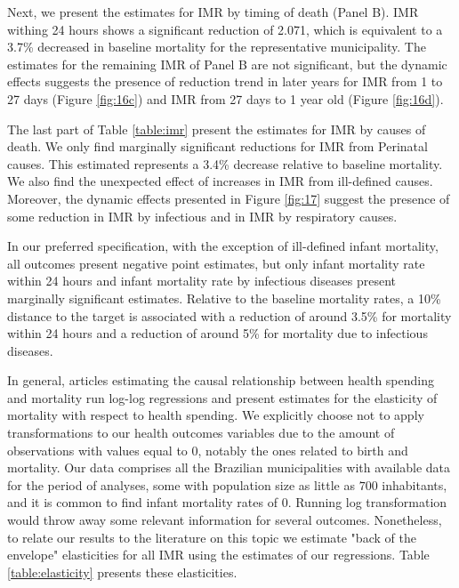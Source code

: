 

Next, we present the estimates for IMR by timing of death (Panel B). IMR withing 24 hours shows a significant reduction of 2.071, which is equivalent to a 3.7\% decreased in baseline mortality for the representative municipality. The estimates for the remaining IMR of Panel B are not significant, but the dynamic effects suggests the presence of reduction trend in later years for IMR from 1 to 27 days (Figure \ref{fig:16c}) and IMR from 27 days to 1 year old (Figure \ref{fig:16d}).



The last part of Table \ref{table:imr} present the estimates for IMR by causes of death. We only find marginally significant reductions for IMR from Perinatal causes. This estimated represents a 3.4\% decrease relative to baseline mortality. We also find the unexpected effect of increases in IMR from ill-defined causes. Moreover, the dynamic effects presented in Figure \ref{fig:17} suggest the presence of some reduction in IMR by infectious and in IMR by respiratory causes.

In our preferred specification, with the exception of ill-defined infant mortality, all outcomes present negative point estimates, but only infant mortality rate within 24 hours and infant mortality rate by infectious diseases present marginally significant estimates. Relative to the baseline mortality rates, a 10\% distance to the target is associated with a reduction of around 3.5\% for mortality within 24 hours and a reduction of around 5\% for mortality due to infectious diseases. 



In general, articles estimating the causal relationship between health spending and mortality run log-log regressions and present estimates for the elasticity of mortality with respect to health spending. We explicitly choose not to apply transformations to our health outcomes variables due to the amount of observations with values equal to $0$, notably the ones related to birth and mortality. Our data comprises all the Brazilian municipalities with available data for the period of analyses, some with population size as little as $700$ inhabitants, and it is common to find infant mortality rates of $0$. Running log transformation would throw away some relevant information for several outcomes. Nonetheless, to relate our results to the literature on this topic we estimate "back of the envelope" elasticities for all IMR using the estimates of our regressions. Table \ref{table:elasticity} presents these elasticities. 

